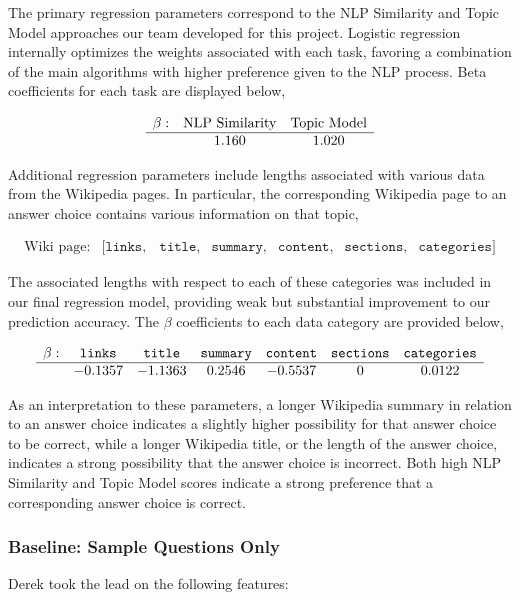 \documentclass{article}
\theoremstyle{mystuff}
\theoremstyle{myexample}
\theoremstyle{named}
\begin{document}
The primary regression parameters correspond to the NLP Similarity and Topic Model approaches our team developed for this project. Logistic regression internally optimizes the weights associated with each task, favoring a combination of the main algorithms with higher preference given to the NLP process. Beta coefficients for each task are displayed below,

\[
	\begin{array}{ccc}
		\textbf{$\beta$}: & \text{NLP Similarity} & \text{Topic Model} \\\hline
			& 1.160 & 1.020
	\end{array}
\]

Additional regression parameters include lengths associated with various data from the Wikipedia pages. In particular, the corresponding Wikipedia page to an answer choice contains various information on that topic,

\[
	\begin{array}{lllllll}
		\text{Wiki page}: & [\texttt{links}, & \texttt{title}, & \texttt{summary}, & \texttt{content}, & \texttt{sections}, & \texttt{categories}]
	\end{array}
\]

The associated lengths with respect to each of these categories was included in our final regression model, providing weak but substantial improvement to our prediction accuracy. The $\beta$ coefficients  to each data category are provided below,

\[
	\begin{array}{lcccccc}
		\textbf{$\beta$}: & \texttt{links} & \texttt{title} & \texttt{summary} & \texttt{content} & \texttt{sections} & \texttt{categories} \\\hline
			& -0.1357 & -1.1363 & 0.2546 & -0.5537 & 0 & 0.0122
	\end{array}
\]

\noindent As an interpretation to these parameters, a longer Wikipedia summary in relation to an answer choice indicates a slightly higher possibility for that answer choice to be correct, while a longer Wikipedia title, or the length of the answer choice, indicates a strong possibility that the answer choice is incorrect. Both high NLP Similarity and Topic Model scores indicate a strong preference that a corresponding answer choice is correct.\\

\subsubsection{Baseline: Sample Questions Only}
Derek took the lead on the following features:\\
\end{document}
